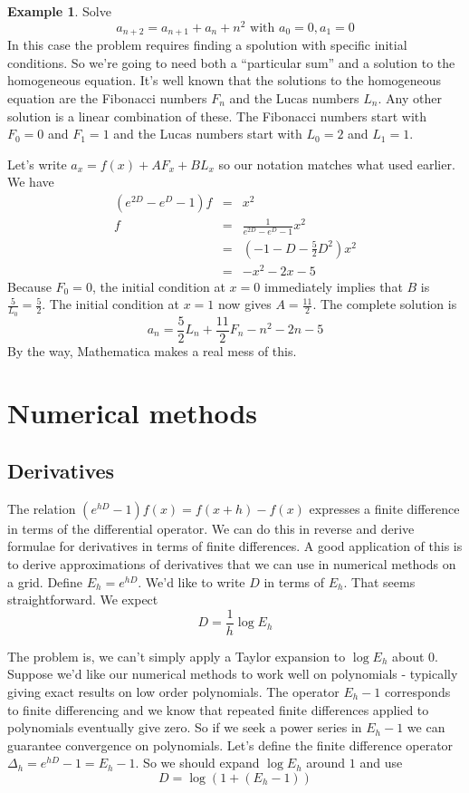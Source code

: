 \documentclass[a4paper]{article}
\theoremstyle{definition}
\newtheorem{example}{Example}[section]
\begin{document}
\begin{example}
Solve
\[
a_{n+2}=a_{n+1}+a_n+n^2 \mbox{ with } a_0=0, a_1=0
\]
In this case the problem requires finding a spolution with specific initial conditions.
So we're going to need both a ``particular sum'' and a solution to the homogeneous equation.
It's well known that the solutions to the homogeneous equation are the Fibonacci numbers $F_n$ and the Lucas numbers $L_n$.
Any other solution is a linear combination of these.
The Fibonacci numbers start with $F_0=0$ and $F_1=1$ and the Lucas numbers start with $L_0=2$ and $L_1=1$.

Let's write $a_x=f(x)+AF_x+BL_x$ so our notation matches what used earlier.
We have
\begin{eqnarray*}
(e^{2D}-e^D-1)f & = & x^2 \\
f & = & \frac{1}{e^{2D}-e^D-1}x^2 \\
  & = & (-1-D-\frac{5}{2}D^2)x^2 \\
  & = & -x^2-2x-5
\end{eqnarray*}
Because $F_0=0$, the initial condition at $x=0$ immediately implies that $B$ is $\frac{5}{L_0}=\frac{5}{2}$.
The initial condition at $x=1$ now gives $A=\frac{11}{2}$.
The complete solution is
\[
a_n = \frac{5}{2}L_n+\frac{11}{2}F_n-n^2-2n-5
\]
By the way, Mathematica makes a real mess of this.
\end{example}

\section{Numerical methods}
\subsection{Derivatives}
The relation $(e^{hD}-1)f(x) = f(x+h)-f(x)$ expresses a finite difference in terms of the differential operator.
We can do this in reverse and derive formulae for derivatives in terms of finite differences.
A good application of this is to derive approximations of derivatives that we can use in numerical methods on a grid.
Define $E_h = e^{hD}$. We'd like to write $D$ in terms of $E_h$.
That seems straightforward. We expect
\[
D=\frac{1}{h}\log E_h
\]

The problem is, we can't simply apply a Taylor expansion to $\log E_h$ about $0$.
Suppose we'd like our numerical methods to work well on polynomials - typically giving exact results on low order polynomials.
The operator $E_h-1$ corresponds to finite differencing and we know that repeated finite differences applied to polynomials eventually give zero.
So if we seek a power series in $E_h-1$ we can guarantee convergence on polynomials.
Let's define the finite difference operator $\Delta_h = e^{hD}-1 = E_h-1$.
So we should expand $\log E_h$ around $1$ and use
\[
D = \log(1+(E_h-1))
\]
\end{document}
